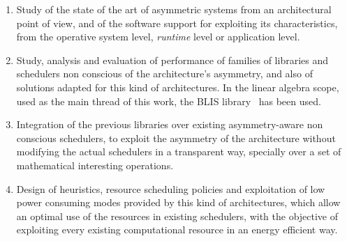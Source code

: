 \begin{enumerate}[T1.]

\item Study of the state of the art of asymmetric systems from an
  architectural point of view, and of the software support for exploiting
  its characteristics, from the operative system level, \emph{runtime}
  level or application level.

\item Study, analysis and evaluation of performance of families of
  libraries and schedulers non conscious of the architecture's asymmetry, and
  also of solutions adapted for this kind of architectures. In the linear
  algebra scope, used as the main thread of this work, the BLIS
  library~\cite{BLIS1} has been used.

\item Integration of the previous libraries over existing asymmetry-aware
  non conscious schedulers, to exploit the asymmetry of the architecture
  without modifying the actual schedulers in a transparent way, specially
  over a set of mathematical interesting operations.

\item Design of heuristics, resource scheduling policies and exploitation
  of low power consuming modes provided by this kind of architectures,
  which allow an optimal use of the resources in existing schedulers, with
  the objective of exploiting every existing computational resource in an
  energy efficient way.
  

\end{enumerate}
